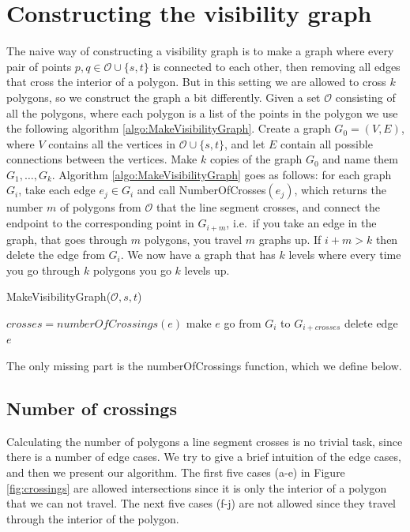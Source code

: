 \section{Constructing the visibility graph}
The naive way of constructing a visibility graph is to make a graph
where every pair of points $p,q \in \mathcal{O} \cup \{s,t\}$ is connected to each other,
then removing all edges that cross the interior of a polygon. But in this
setting we are allowed to cross $k$ polygons, so we construct the graph a bit
differently. Given a set $\mathcal{O}$ consisting of all the polygons, where each polygon
is a list of the points in the polygon we use the following algorithm \ref{algo:MakeVisibilityGraph}.  
Create a graph $G_0=(V,E)$, where $V$ contains all the vertices in $\mathcal{O}\cup \{s,t\}$,
and let $E$ contain all possible connections between the vertices. Make $k$
copies of the graph $G_0$ and name them $G_1,\dots,G_{k}$. Algorithm \ref{algo:MakeVisibilityGraph} goes as
follows: for each graph $G_i$, take each edge $e_j\in G_i$ and call
NumberOfCrosses$(e_j)$, which returns the number $m$ of polygons from $\mathcal{O}$ that the
line segment crosses, and connect the endpoint to the corresponding point in
$G_{i+m}$, i.e.\ if you take an edge in the graph, that goes through $m$
polygons, you travel $m$ graphs up. If $i+m > k$ then delete the edge from
$G_i$. We now
have a graph that has $k$ levels where every time you go through $k$ polygons
you go $k$ levels up.

\begin{algorithm} 
	\caption{MakeVisibilityGraph($\mathcal{O},s,t$)}
	\begin{algorithmic}[1]
			\State $crosses = numberOfCrossings(e)$
				\State make $e$ go from $G_i$ to $G_{i+crosses}$
			\Else
				\State delete edge $e$
			\EndIf
		\EndFor
		\EndFor
	\end{algorithmic}
	\label{algo:MakeVisibilityGraph}
\end{algorithm}

The only missing part is the numberOfCrossings function, which we define
below.

\subsection{Number of crossings}
Calculating the number of polygons a line segment crosses is no trivial task,
since there is a number of edge cases. We try to give a brief intuition of the
edge cases, and then we present our algorithm.
The first five cases (a-e) in Figure \ref{fig:crossings} are allowed intersections since
it is only the interior of a polygon that we can not travel. The
next five cases (f-j) are not allowed since they travel through the interior
of the polygon.

